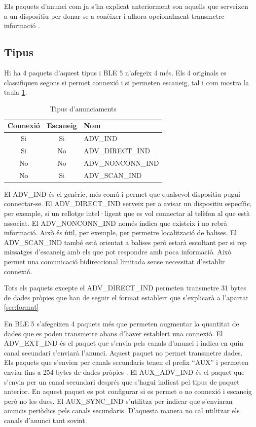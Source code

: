 Els paquets d'anunci com ja s'ha explicat anteriorment son aquells que serveixen a un dispositiu per donar-se a conèixer i alhora opcionalment transmetre informació \cite{Advertising}.

\subsection{Tipus}
Hi ha 4 paquets d'aquest tipus i BLE 5 n'afegeix 4 més.
Els 4 originals es classifiquen segons si permet connexió i si permeten escaneig, tal i com mostra la taula \ref{tab:Advertisment_Types}.

\begin{table}[!h]
	\begin{center}
		\begin{tabular}{|c|c|l|}
			\hline
			Connexió	&	Escaneig	&	Nom	\\	\hline
			Si			&	Si			&	ADV\_IND	\\	\hline
			Si			&	No			&	ADV\_DIRECT\_IND	\\	\hline
			No			&	No			&	ADV\_NONCONN\_IND	\\	\hline
			No			&	Si			&	ADV\_SCAN\_IND	\\	\hline
		\end{tabular}
	\end{center}
\caption{Tipus d'anunciaments}
\label{tab:Advertisment_Types}
\end{table}


El ADV\_IND és el genèric, més comú i permet que qualsevol dispositiu pugui connectar-se.
El ADV\_DIRECT\_IND serveix per a avisar un dispositiu específic, per exemple, si un rellotge intel·ligent que es vol connectar al telèfon al que està associat.
El ADV\_NONCONN\_IND només indica que existeix i no rebrà informació.
Això és útil, per exemple, per permetre localització de balises.
El ADV\_SCAN\_IND també està orientat a balises però estarà escoltant per si rep missatges d'escaneig amb els que pot respondre amb poca informació.
Això permet una comunicació bidireccional limitada sense necessitat d'establir connexió.

Tots els paquets excepte el ADV\_DIRECT\_IND permeten transmetre 31 bytes de dades pròpies que han de seguir el format establert que s'explicarà a l'apartat \ref{sec:format}

\label{Advertising_Extension_PDU}
En BLE 5 s'afegeixen 4 paquets més que permeten augmentar la quantitat de dades que es poden transmetre abans d'haver establert una connexió.
El ADV\_EXT\_IND és el paquet que s'envia pels canals d'anunci i indica en quin canal secundari s'enviarà l'anunci. Aquest paquet no permet transmetre dades.
Els paquets que s'envien per canals secundaris tenen el prefix ``AUX'' i permeten enviar fins a 254 bytes de dades pròpies .
El AUX\_ADV\_IND és el paquet que s'envia per un canal secundari després que s'hagui indicat pel tipus de paquet anterior.
En aquest paquet es pot configurar si es permet o no connexió i escaneig però no les dues.
El AUX\_SYNC\_IND s'utilitza per indicar que s'enviaran anuncis periòdics pels canals secundaris.
D'aquesta manera no cal utilitzar els canals d'anunci tant sovint.

